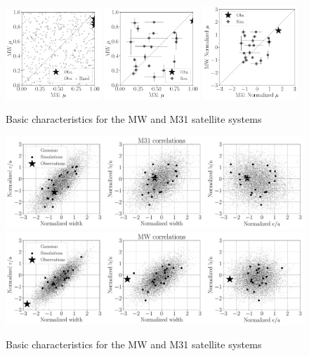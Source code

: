 \documentclass[a4paper,fleqn,usenatbib]{mnras}
\begin{document}
\begin{figure}
\centering
\includegraphics[width=0.32\textwidth]{scatter_random_ranked_mu.pdf}
\includegraphics[width=0.32\textwidth]{scatter_ranked_mu.pdf}
\includegraphics[width=0.32\textwidth]{scatter_norm_mu.pdf}
\caption{Basic characteristics for the MW and M31 satellite systems
\label{fig:lg_scatter}}
\end{figure}


\begin{figure}
\centering
\includegraphics[width=1.0\textwidth]{correlations_M31.pdf}
\includegraphics[width=1.0\textwidth]{correlations_MW.pdf}
\caption{Basic characteristics for the MW and M31 satellite systems
\label{fig:lg_scatter}}
\end{figure}
\end{document}
